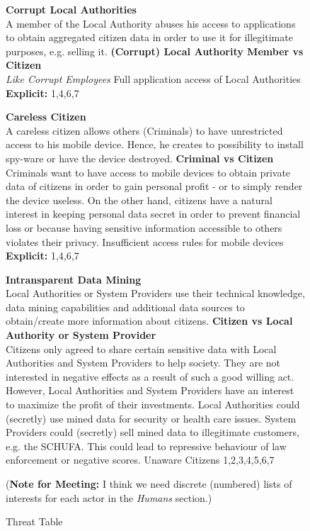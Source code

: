 \begin{landscape}
\begin{figure}
\begin{ThreatTable}
\ThreatTableContentRow
{\textbf{Corrupt Local Authorities}
\\A member of the Local Authority abuses his access to applications 
to obtain aggregated citizen data in order to use it for illegitimate purposes, e.g. selling it.}
{\textbf{(Corrupt) Local Authority Member vs Citizen}
\\\textit{Like Corrupt Employees}}
{Full application access of Local Authorities}
{\textbf{Explicit:} 1,4,6,7}

\ThreatTableContentRow
{\textbf{Careless Citizen}
\\A careless citizen allows others (Criminals) to have unrestricted access to his mobile device. 
Hence, he creates to possibility to install spy-ware or have the device destroyed.}
{\textbf{Criminal vs Citizen}
\\Criminals want to have access to mobile devices to obtain private data of citizens in order to 
gain personal profit - or to simply render the device useless. On the other hand, citizens have a 
natural interest in keeping personal data secret in order to prevent financial loss or because having
sensitive information accessible to others violates their privacy.}
{Insufficient access rules for mobile devices}
{\textbf{Explicit:} 1,4,6,7}

\ThreatTableContentRow
{\textbf{Intransparent Data Mining}
\\Local Authorities or System Providers use their technical knowledge, data mining capabilities and 
additional data sources to obtain/create more information about citizens.}
{\textbf{Citizen vs Local Authority or System Provider}
\\Citizens only agreed to share certain sensitive data with Local Authorities and System Providers to help society.
They are not interested in negative effects as a result of such a good willing act.
However, Local Authorities and System Providers have an interest to maximize the profit of their investments.
Local Authorities could (secretly) use mined data for security or health care issues. System Providers could
(secretly) sell mined data to illegitimate customers, e.g. the SCHUFA. This could lead to repressive behaviour of law
enforcement or negative scores.}
{Unaware Citizens}
{1,2,3,4,5,6,7}

\end{ThreatTable}

{\scriptsize (\textbf{Note for Meeting:} I think we need discrete (numbered) lists of interests for each actor in the \textit{Humans} section.)}

\caption{Threat Table}
\end{figure}
\end{landscape}
